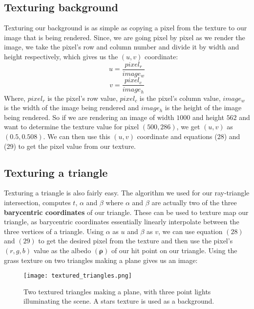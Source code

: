 \documentclass[11pt,a4paper]{article}
\begin{document}
	\subsection{Texturing background}
	Texturing our background is as simple as copying a pixel from the texture to our image that is being rendered. Since, we are going pixel by pixel as we render the image, we take the pixel's row and column number and divide it by width and height respectively, which gives us the $(u, v)$ coordinate:
	\begin{equation}
		u = \frac{pixel_{r}}{image_{w}}
	\end{equation}
	\begin{equation}
		v = \frac{pixel_{c}}{image_{h}}
	\end{equation}
	\noindent
	Where, $pixel_{r}$ is the pixel's row value, $pixel_{c}$ is the pixel's column value, $image_{w}$ is the width of the image being rendered and $image_{h}$ is the height of the image being rendered. So if we are rendering an image of width $1000$ and height $562$ and want to determine the texture value for pixel $(500, 286)$, we get $(u, v)$ as $(0.5, 0.508)$. We can then use this $(u, v)$ coordinate and equations (28) and (29) to get the pixel value from our texture.
	
	\subsection{Texturing a triangle}
	Texturing a triangle is also fairly easy. The algorithm we used for our ray-triangle intersection, computes $t$, $\alpha$ and $\beta$ where $\alpha$ and $\beta$ are actually two of the three \textbf{barycentric coordinates} of our triangle. These can be used to texture map our triangle, as barycentric coordinates essentially linearly interpolate between the three vertices of a triangle. Using $\alpha$ as $u$ and $\beta$ as $v$, we can use equation $(28)$ and $(29)$ to get the desired pixel from the texture and then use the pixel's $(r, g, b)$ value as the albedo $(\boldsymbol{\rho})$ of our hit point on our triangle. Using the grass texture on two triangles making a plane gives us an image:
	\begin{figure}[H]
		\centering
		\captionsetup{justification=centering}
		\texttt{[image: textured\_triangles.png]}\quad
		\caption{Two textured triangles making a plane, with three point lights illuminating the scene. A stars texture is used as a background.}
	\end{figure}
	
\end{document}
